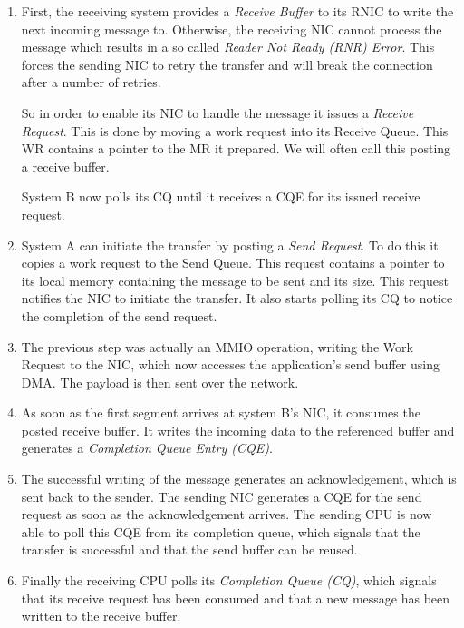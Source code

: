 \begin{enumerate}
  \item First, the receiving system provides a \emph{Receive Buffer} to its RNIC to write the next incoming message to.
    Otherwise, the receiving NIC cannot process the message which results in a so called \emph{Reader Not Ready (RNR) Error}.
    This forces the sending NIC to retry the transfer and will break the connection after a number of retries.

    So in order to enable its NIC to handle the message it issues a \emph{Receive Request}. This is done by moving a work request into its 
    Receive Queue. This WR contains a pointer to the MR it prepared. We will often call this posting a receive buffer. 

    System B now polls its CQ until it receives a CQE for its issued receive request.

  \item System A can initiate the transfer by posting a \emph{Send Request}. To do this it copies a work request to 
    the Send Queue. This request contains a pointer to its local memory containing the  message to be sent
    and its size. This request notifies the NIC to initiate the transfer.
    It also starts polling its CQ to notice the completion of the send request.

  \item The previous step was actually an MMIO operation, writing the Work Request to the NIC, which now 
    accesses the application's send buffer using DMA. The payload is then sent over the network.

  \item As soon as the first segment arrives at system B's NIC, it consumes the posted receive buffer. It writes the incoming
    data to the referenced buffer and generates a \emph{Completion Queue Entry (CQE)}. 

  \item The successful writing of the message generates an acknowledgement, which is sent back to the sender. The sending NIC
    generates a CQE for the send request as soon as the acknowledgement arrives. The sending CPU is now able to poll this CQE
    from its completion queue, which signals that the transfer is successful and that the send buffer can be reused.

  \item Finally the receiving CPU polls its \emph{Completion Queue (CQ)}, which signals that its receive request has been 
    consumed and that a new message has been written to the receive buffer.
\end{enumerate}

